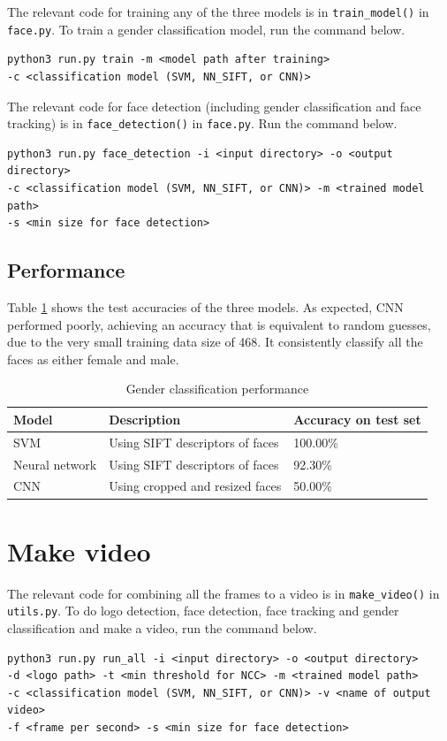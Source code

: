 \documentclass{article}
\begin{document}
The relevant code for training any of the three models is in \texttt{train\_model()} in \texttt{face.py}. To train a gender classification model, run the command below.
\begin{verbatim}
python3 run.py train -m <model path after training> 
-c <classification model (SVM, NN_SIFT, or CNN)>
\end{verbatim}

The relevant code for face detection (including gender classification and face tracking) is in \texttt{face\_detection()} in \texttt{face.py}. Run the command below.
\begin{verbatim}
python3 run.py face_detection -i <input directory> -o <output directory>
-c <classification model (SVM, NN_SIFT, or CNN)> -m <trained model path>
-s <min size for face detection> 
\end{verbatim}

\subsection*{Performance}
Table \ref{tab:gender_classification} shows the test accuracies of the three models. As expected, CNN performed poorly, achieving an accuracy that is equivalent to random guesses, due to the very small training data size of 468. It consistently classify all the faces as either female and male.

\begin{table}[h]
 \caption{Gender classification performance}
  \centering
  \begin{tabular}{lll}
    \toprule
    Model		& Description														& Accuracy on test set \\
    \midrule
    SVM							& 	Using SIFT descriptors of faces						& 100.00\% \\
    Neural network		& Using SIFT descriptors of faces							& 92.30\% \\
    CNN							&	Using cropped and resized faces						& 50.00\% \\
    \bottomrule
  \end{tabular}
  \label{tab:gender_classification}
\end{table}

\section{Make video}
The relevant code for combining all the frames to a video is in \texttt{make\_video()} in \texttt{utils.py}. To do logo detection, face detection, face tracking and gender classification and make a video, run the command below.
\begin{verbatim}
python3 run.py run_all -i <input directory> -o <output directory>
-d <logo path> -t <min threshold for NCC> -m <trained model path>
-c <classification model (SVM, NN_SIFT, or CNN)> -v <name of output video>
-f <frame per second> -s <min size for face detection>
\end{verbatim}
\end{document}

